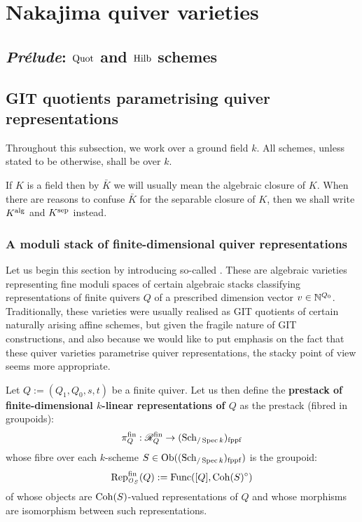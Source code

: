 \section{Nakajima quiver varieties}
    \subsection{\textit{Pr\'elude}: \texorpdfstring{$\mathrm{Quot}$}{} and \texorpdfstring{$\mathrm{Hilb}$}{} schemes}

    \subsection{GIT quotients parametrising quiver representations}
        \begin{convention}
            Throughout this subsection, we work over a ground field $k$. All schemes, unless stated to be otherwise, shall be over $k$.
        \end{convention}
        \begin{convention}
            If $K$ is a field then by $\bar{K}$ we will usually mean the algebraic closure of $K$. When there are reasons to confuse $\bar{K}$ for the separable closure of $K$, then we shall write $K^{\mathrm{alg}}$ and $K^{\mathrm{sep}}$ instead. 
        \end{convention}
        
        \subsubsection{A moduli stack of finite-dimensional quiver representations}
            Let us begin this section by introducing so-called . These are algebraic varieties representing fine moduli spaces of certain algebraic stacks classifying representations of finite quivers $Q$ of a prescribed dimension vector $v \in \mathbb{N}^{Q_0}$. Traditionally, these varieties were usually realised as GIT quotients of certain naturally arising affine schemes, but given the fragile nature of GIT constructions, and also because we would like to put emphasis on the fact that these quiver varieties parametrise quiver representations, the stacky point of view seems more appropriate. 
            \begin{definition} \label{def: quiver_representation_stacks}
                Let $Q := (Q_1, Q_0, s, t)$ be a finite quiver. Let us then define the \textbf{prestack of finite-dimensional $k$-linear representations of $Q$} as the prestack (fibred in groupoids):
                    $$\pi_Q^{\mathrm{fin}}: \mathscr{R}_Q^{\mathrm{fin}} \to (\mathrm{Sch}_{/\operatorname{Spec} k})_{\mathrm{fppf}}$$
                whose fibre over each $k$-scheme $S \in \mathrm{Ob}((\mathrm{Sch}_{/\operatorname{Spec} k})_{\mathrm{fppf}})$ is the groupoid:
                    $$\mathrm{Rep}_{\mathcal{O}_S}^{\mathrm{fin}}(Q) := \mathrm{Func}([Q], \mathrm{Coh}(S)^{\circ})$$
                of whose objects are $\mathrm{Coh}(S)$-valued representations of $Q$ and whose morphisms are isomorphism between such representations.  
            \end{definition}
            \begin{remark}
                
            \end{remark}
                
